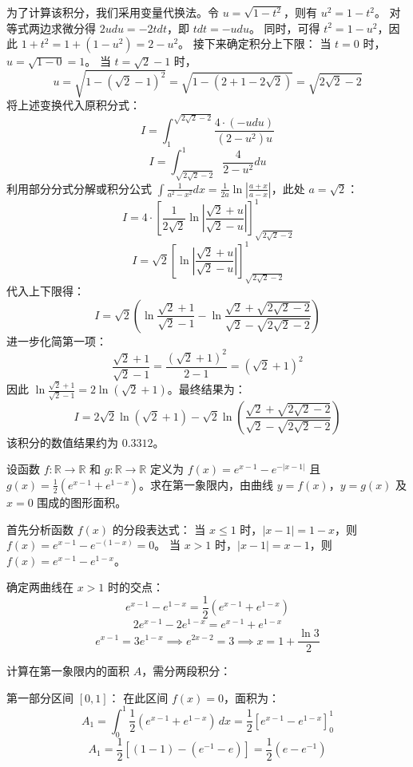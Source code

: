 \begin{questions}
\begin{solution}
为了计算该积分，我们采用变量代换法。令 $u = \sqrt{1 - t^2}$，则有 $u^2 = 1 - t^2$。
对等式两边求微分得 $2u du = -2t dt$，即 $t dt = -u du$。
同时，可得 $t^2 = 1 - u^2$，因此 $1 + t^2 = 1 + \left( 1 - u^2 \right) = 2 - u^2$。
接下来确定积分上下限：
当 $t = 0$ 时，$u = \sqrt{1 - 0} = 1$。
当 $t = \sqrt{2} - 1$ 时，
\[
u = \sqrt{1 - \left( \sqrt{2} - 1 \right)^2} = \sqrt{1 - \left( 2 + 1 - 2\sqrt{2} \right)} = \sqrt{2\sqrt{2} - 2}
\]
将上述变换代入原积分式：
\[
I = \int_{1}^{\sqrt{2\sqrt{2}-2}} \frac{4 \cdot \left( -u du \right)}{\left( 2 - u^2 \right) u}
\]
\[
I = \int_{\sqrt{2\sqrt{2}-2}}^{1} \frac{4}{2 - u^2} du
\]
利用部分分式分解或积分公式 $\int \frac{1}{a^2 - x^2} dx = \frac{1}{2a} \ln \left| \frac{a + x}{a - x} \right|$，此处 $a = \sqrt{2}$：
\[
I = 4 \cdot \left[ \frac{1}{2\sqrt{2}} \ln \left| \frac{\sqrt{2} + u}{\sqrt{2} - u} \right| \right]_{\sqrt{2\sqrt{2}-2}}^{1}
\]
\[
I = \sqrt{2} \left[ \ln \left| \frac{\sqrt{2} + u}{\sqrt{2} - u} \right| \right]_{\sqrt{2\sqrt{2}-2}}^{1}
\]
代入上下限得：
\[
I = \sqrt{2} \left( \ln \frac{\sqrt{2} + 1}{\sqrt{2} - 1} - \ln \frac{\sqrt{2} + \sqrt{2\sqrt{2}-2}}{\sqrt{2} - \sqrt{2\sqrt{2}-2}} \right)
\]
进一步化简第一项：
\[
\frac{\sqrt{2} + 1}{\sqrt{2} - 1} = \frac{\left( \sqrt{2} + 1 \right)^2}{2 - 1} = \left( \sqrt{2} + 1 \right)^2
\]
因此 $\ln \frac{\sqrt{2} + 1}{\sqrt{2} - 1} = 2 \ln \left( \sqrt{2} + 1 \right)$。最终结果为：
\[
I = 2\sqrt{2} \ln \left( \sqrt{2} + 1 \right) - \sqrt{2} \ln \left( \frac{\sqrt{2} + \sqrt{2\sqrt{2}-2}}{\sqrt{2} - \sqrt{2\sqrt{2}-2}} \right)
\]
该积分的数值结果约为 $0.3312$。
\end{solution}

\question
设函数 $f: \mathbb{R} \to \mathbb{R}$ 和 $g: \mathbb{R} \to \mathbb{R}$ 定义为 $f(x) = e^{x-1} - e^{-|x-1|}$ 且 $g(x) = \frac{1}{2}(e^{x-1} + e^{1-x})$。求在第一象限内，由曲线 $y = f(x)$，$y = g(x)$ 及 $x = 0$ 围成的图形面积。

\begin{solution}
首先分析函数 $f(x)$ 的分段表达式：
当 $x \le 1$ 时，$|x-1| = 1-x$，则 $f(x) = e^{x-1} - e^{-(1-x)} = 0$。
当 $x > 1$ 时，$|x-1| = x-1$，则 $f(x) = e^{x-1} - e^{1-x}$。

确定两曲线在 $x > 1$ 时的交点：
\[ e^{x-1} - e^{1-x} = \frac{1}{2}(e^{x-1} + e^{1-x}) \]
\[ 2e^{x-1} - 2e^{1-x} = e^{x-1} + e^{1-x} \]
\[ e^{x-1} = 3e^{1-x} \implies e^{2x-2} = 3 \implies x = 1 + \frac{\ln 3}{2} \]

计算在第一象限内的面积 $A$，需分两段积分：

第一部分区间 $[0, 1]$：
在此区间 $f(x) = 0$，面积为：
\[ A_1 = \int_{0}^{1} \frac{1}{2}(e^{x-1} + e^{1-x}) \,dx = \frac{1}{2} [e^{x-1} - e^{1-x}]_{0}^{1} \]
\[ A_1 = \frac{1}{2} [ (1 - 1) - (e^{-1} - e) ] = \frac{1}{2}(e - e^{-1}) \]


\end{solution}
\end{questions}
